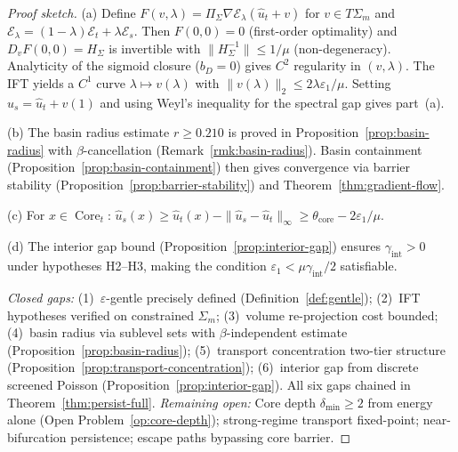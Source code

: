 \documentclass[lettersize,journal]{IEEEtran}
\DeclareMathOperator{\Core}{Core}
\begin{document}
\begin{proof}[Proof sketch]
(a) Define $F(v, \lambda) = \Pi_\Sigma \nabla \mathcal{E}_\lambda(\hat{u}_t + v)$ for $v \in T\Sigma_m$ and $\mathcal{E}_\lambda = (1-\lambda)\mathcal{E}_t + \lambda \mathcal{E}_s$. Then $F(0,0) = 0$ (first-order optimality) and $D_v F(0,0) = H_\Sigma$ is invertible with $\|H_\Sigma^{-1}\| \leq 1/\mu$ (non-degeneracy). Analyticity of the sigmoid closure ($b_D = 0$) gives $C^2$ regularity in $(v,\lambda)$. The IFT yields a $C^1$ curve $\lambda \mapsto v(\lambda)$ with $\|v(\lambda)\|_2 \leq 2\lambda\varepsilon_1/\mu$. Setting $\hat{u}_s = \hat{u}_t + v(1)$ and using Weyl's inequality for the spectral gap gives part~(a).

(b) The basin radius estimate $r \geq 0.210$ is proved in Proposition~\ref{prop:basin-radius} with $\beta$-cancellation (Remark~\ref{rmk:basin-radius}). Basin containment (Proposition~\ref{prop:basin-containment}) then gives convergence via barrier stability (Proposition~\ref{prop:barrier-stability}) and Theorem~\ref{thm:gradient-flow}.

(c) For $x \in \Core_t$: $\hat{u}_s(x) \geq \hat{u}_t(x) - \|\hat{u}_s - \hat{u}_t\|_\infty \geq \theta_{\mathrm{core}} - 2\varepsilon_1/\mu$.

(d) The interior gap bound (Proposition~\ref{prop:interior-gap}) ensures $\gamma_{\mathrm{int}} > 0$ under hypotheses H2--H3, making the condition $\varepsilon_1 < \mu\gamma_{\mathrm{int}}/2$ satisfiable.

\emph{Closed gaps:} (1)~$\varepsilon$-gentle precisely defined (Definition~\ref{def:gentle}); (2)~IFT hypotheses verified on constrained $\Sigma_m$; (3)~volume re-projection cost bounded; (4)~basin radius via sublevel sets with $\beta$-independent estimate (Proposition~\ref{prop:basin-radius}); (5)~transport concentration two-tier structure (Proposition~\ref{prop:transport-concentration}); (6)~interior gap from discrete screened Poisson (Proposition~\ref{prop:interior-gap}). All six gaps chained in Theorem~\ref{thm:persist-full}.
\emph{Remaining open:} Core depth $\delta_{\min} \geq 2$ from energy alone (Open Problem~\ref{op:core-depth}); strong-regime transport fixed-point; near-bifurcation persistence; escape paths bypassing core barrier.
\end{proof}
\end{document}
